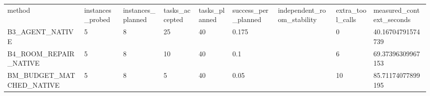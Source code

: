 \begin{tabular}{lllllllll}
method & instances\_probed & instances\_planned & tasks\_accepted & tasks\_planned & success\_per\_planned & independent\_room\_stability & extra\_tool\_calls & measured\_context\_seconds \\
B3\_AGENT\_NATIVE & 5 & 8 & 25 & 40 & 0.175 &  & 0 & 40.16704791574739 \\
B4\_ROOM\_REPAIR\_NATIVE & 5 & 8 & 10 & 40 & 0.1 &  & 6 & 69.37396309967153 \\
BM\_BUDGET\_MATCHED\_NATIVE & 5 & 8 & 5 & 40 & 0.05 &  & 10 & 85.71174077899195 \\
\end{tabular}
